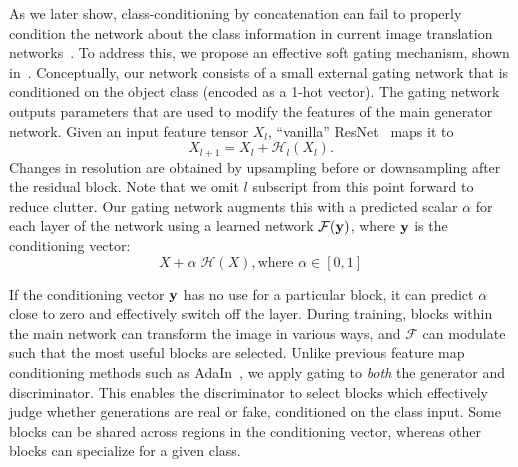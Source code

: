 As we later show, class-conditioning by concatenation can fail to properly condition the network about the class information in current image translation networks~\cite{isola2016image2image,zhu2017toward}.
%
To address this, we propose an effective soft gating mechanism, shown in~.
Conceptually, our network consists of a small external gating network that is conditioned on the object class (encoded as a 1-hot vector).
The gating network outputs parameters that are used to modify the features of the main generator network.
Given an input feature tensor $X_l$, ``vanilla'' ResNet~\cite{he2016deep} maps it to
\begin{equation}
	X_{l+1} = X_l+\mathcal{H}_l(X_l).
\end{equation}
Changes in resolution are obtained by upsampling before or downsampling after the residual block.
Note that we omit $l$ subscript from this point forward to reduce clutter.
Our gating network augments this with a predicted scalar $\alpha$ for each layer of the network using a learned network $\mathcal{F}({\bf y})$, where ${\bf y}$ is the conditioning vector:
\begin{equation}
	X + \alpha \; \mathcal{H}(X), \text{where } \alpha \in [0,1]
\end{equation}

If the conditioning vector ${\bf y}$ has no use for a particular block, it can predict $\alpha$ close to zero and effectively switch off the layer.
During training, blocks within the main network can transform the image in various ways, and $\mathcal{F}$ can modulate such that the most useful blocks are selected. 
Unlike previous feature map conditioning methods such as AdaIn~\cite{ulyanovinstance}, we apply gating to \emph{both} the generator and discriminator. 
This enables the discriminator to select blocks which effectively judge whether generations are real or fake, conditioned on the class input.
Some blocks can be shared across regions in the conditioning vector, whereas other blocks can specialize for a given class.

